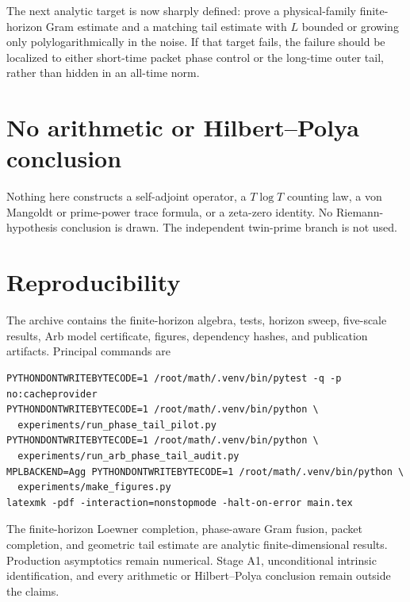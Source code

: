 \documentclass[11pt]{article}
\theoremstyle{remark}
\begin{document}
The next analytic target is now sharply defined: prove a physical-family
finite-horizon Gram estimate and a matching tail estimate with $L$ bounded or
growing only polylogarithmically in the noise.  If that target fails, the
failure should be localized to either short-time packet phase control or the
long-time outer tail, rather than hidden in an all-time norm.

\section{No arithmetic or Hilbert--Polya conclusion}

Nothing here constructs a self-adjoint operator, a $T\log T$ counting law, a
von Mangoldt or prime-power trace formula, or a zeta-zero identity.  No
Riemann-hypothesis conclusion is drawn.  The independent twin-prime branch is
not used.

\section{Reproducibility}

The archive contains the finite-horizon algebra, tests, horizon sweep,
five-scale results, Arb model certificate, figures, dependency hashes, and
publication artifacts.  Principal commands are
\begin{verbatim}
PYTHONDONTWRITEBYTECODE=1 /root/math/.venv/bin/pytest -q -p no:cacheprovider
PYTHONDONTWRITEBYTECODE=1 /root/math/.venv/bin/python \
  experiments/run_phase_tail_pilot.py
PYTHONDONTWRITEBYTECODE=1 /root/math/.venv/bin/python \
  experiments/run_arb_phase_tail_audit.py
MPLBACKEND=Agg PYTHONDONTWRITEBYTECODE=1 /root/math/.venv/bin/python \
  experiments/make_figures.py
latexmk -pdf -interaction=nonstopmode -halt-on-error main.tex
\end{verbatim}

The finite-horizon Loewner completion, phase-aware Gram fusion, packet
completion, and geometric tail estimate are analytic finite-dimensional
results.  Production asymptotics remain numerical.  Stage A1, unconditional
intrinsic identification, and every arithmetic or Hilbert--Polya conclusion
remain outside the claims.



\end{document}
